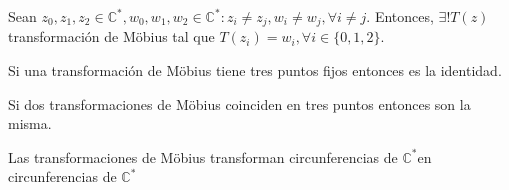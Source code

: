 \begin{theo}
  Sean $z_{0}, z_{1}, z_{2} \in \mathbb{C}^{*}, w_{0}, w_{1}, w_{2} \in \mathbb{C}^{*}: z_{i} \neq z_{j}, w_{i} \neq w_{j}, \forall i \neq j$. Entonces, $ \exists ! T(z)$ transformación de Möbius tal que $T(z_{i}) = w_{i}, \forall i \in \{ 0, 1, 2 \}$. 
\end{theo}

\begin{cor}
  Si una transformación de Möbius tiene tres puntos fijos entonces es la identidad.
\end{cor}

\begin{cor}
  Si dos transformaciones de Möbius coinciden en tres puntos entonces son la misma.
\end{cor}

\begin{theo}
  Las transformaciones de Möbius transforman circunferencias de $\mathbb{C}^{*}$en circunferencias de $\mathbb{C}^{*}$
\end{theo}
